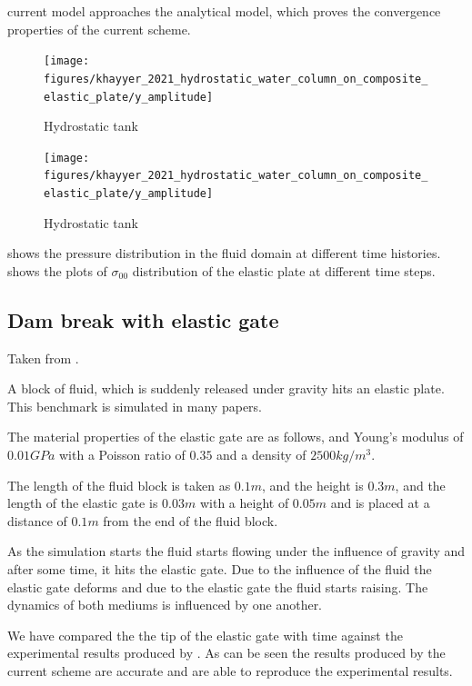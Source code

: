 \documentclass[preprint,12pt]{elsarticle}
\newcommand{\todoin}{\todo[inline]}
\begin{document}
current model approaches the analytical model, which proves the convergence
properties of the current scheme. \todoin{compare with other numerical schemes}
%
%
%
\begin{figure}[!htpb]
  \centering
  \texttt{[image: figures/khayyer\_2021\_hydrostatic\_water\_column\_on\_composite\_elastic\_plate/y\_amplitude]}
  \caption{Hydrostatic tank}
\label{fig:p-hs-tank-elastic-plate}
\end{figure}
%
%
%
\begin{figure}[!htpb]
  \centering
  \texttt{[image: figures/khayyer\_2021\_hydrostatic\_water\_column\_on\_composite\_elastic\_plate/y\_amplitude]}
  \caption{Hydrostatic tank}
\label{fig:sigma-hs-tank-elastic-plate}
\end{figure}

 shows the pressure distribution in the
fluid domain at different time histories. 
shows the plots of $\sigma_{00}$ distribution of the elastic plate at
different time steps.

\FloatBarrier%

\subsection{Dam break with elastic gate}
\label{sec:dam-break-elastic-gate}

Taken from \citet{sun2019fully, ng2020coupled}.

A block of fluid, which is suddenly released under gravity hits an elastic
plate. This benchmark is simulated in many papers.

The material properties of the elastic gate are as follows, and Young's
modulus of $0.01 GPa$ with a Poisson ratio of $0.35$ and a density of
$2500 kg/m^3$.

The length of the fluid block is taken as $0.1m$, and the height is $0.3m$,
and the length of the elastic gate is $0.03m$ with a height of $0.05m$ and is
placed at a distance of $0.1m$ from the end of the fluid block.


As the simulation starts the fluid starts flowing under the influence of
gravity and after some time, it hits the elastic gate. Due to the influence of
the fluid the elastic gate deforms and due to the elastic gate the fluid
starts raising. The dynamics of both mediums is influenced by one another.


We have compared the the tip of the elastic gate with time against the
experimental results produced by \cite{xxx}. As can be seen the results
produced by the current scheme are accurate and are able to reproduce the
experimental results.
\end{document}
